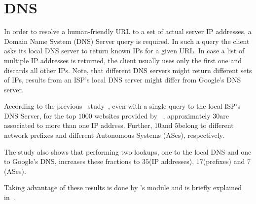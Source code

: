 \section{DNS}
\label{sec:background-dns}

In order to resolve a human-friendly URL to a set of actual server IP addresses, a Domain Name System (DNS) Server query is required. 
In such a query the client asks its local DNS server to return known IPs for a given URL. 
In case a list of multiple IP addresses is returned, the client usually uses only the first one and discards all other IPs. 
Note, that different DNS servers might return different sets of IPs, \eg results from an ISP's local DNS server might differ from Google's DNS server. 

According to the previous \mhttp~study~\cite{KIM13-MHTTP}, even with a single query to the local ISP's DNS Server, for the top $1000$ websites provided by ~\cite{URL-ALEXA}, approximately $30$\perc are associated to more than one IP address. 
Further, $10$\perc and $5$\perc belong to different network prefixes and different Autonomous Systems (ASes), respectively. 

The study also shows that performing two lookups, one to the local DNS and one to Google's DNS, increases these fractions to $35$\perc (IP addresses), $17$\perc (prefixes) and $7$\perc (ASes). 

Taking advantage of these results is done by \mhttp's  module and is briefly explained in~. 
